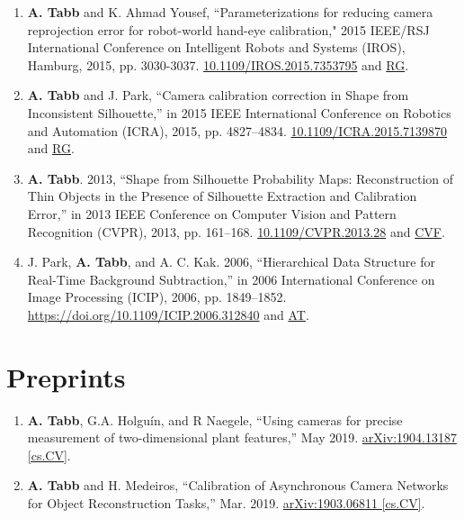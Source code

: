 \documentclass[letterpaper,11pt]{article}
\begin{document}
\begin{enumerate}[noitemsep, leftmargin=*,resume*]
\item{\textbf{A. Tabb} and K. Ahmad Yousef, ``Parameterizations for reducing camera reprojection error for robot-world hand-eye calibration," 2015 IEEE/RSJ International Conference on Intelligent Robots and Systems (IROS), Hamburg, 2015, pp. 3030-3037. \href{https://doi.org/10.1109/IROS.2015.7353795}{10.1109/IROS.2015.7353795} and \href{https://www.researchgate.net/publication/280925717_Parameterizations_for_Reducing_Camera_Reprojection_Error_for_Robot-World_Hand-Eye_Calibration}{RG}.}

\item{\textbf{A. Tabb} and J. Park, ``Camera calibration correction in Shape from Inconsistent Silhouette,” in 2015 IEEE International Conference on Robotics and Automation (ICRA), 2015, pp. 4827–4834. \href{https://doi.org/10.1109/ICRA.2015.7139870}{10.1109/ICRA.2015.7139870} and \href{https://www.researchgate.net/publication/282710124_Camera_calibration_correction_in_Shape_from_Inconsistent_Silhouette}{RG}.}

\item{\textbf{A. Tabb}. 2013, ``Shape from Silhouette Probability Maps: Reconstruction of Thin Objects in the Presence of Silhouette Extraction and Calibration Error,” in 2013 IEEE Conference on Computer Vision and Pattern Recognition (CVPR), 2013, pp. 161–168.   \href{https://doi.org/10.1109/CVPR.2013.28}{10.1109/CVPR.2013.28} and \href{https://www.cv-foundation.org/openaccess/content_cvpr_2013/papers/Tabb_Shape_from_Silhouette_2013_CVPR_paper.pdf}{CVF}.}

\item{J. Park, \textbf{A. Tabb}, and A. C. Kak. 2006, ``Hierarchical Data Structure for Real-Time Background Subtraction,” in 2006 International Conference on Image Processing (ICIP), 2006, pp. 1849–1852. \url{https://doi.org/10.1109/ICIP.2006.312840} and \href{https://amytabb.com/pubs/Park_06_hierarchical_data_structure_for_real-time_background_subtraction.pdf}{AT}.}

\end{enumerate}

\section{Preprints}
\begin{enumerate}[noitemsep, leftmargin=*,resume*]
\item{\textbf{A. Tabb}, G.A. Holgu\'{i}n, and R Naegele, “Using cameras for precise measurement of two-dimensional plant features,” May 2019. \href{https://arxiv.org/abs/1904.13187}{arXiv:1904.13187 [cs.CV]}.}

\item{\textbf{A. Tabb} and H. Medeiros, “Calibration of Asynchronous Camera Networks for Object Reconstruction Tasks,” Mar. 2019. \href{https://arxiv.org/abs/1903.06811}{arXiv:1903.06811 [cs.CV]}.}
\end{enumerate}
\end{document}
